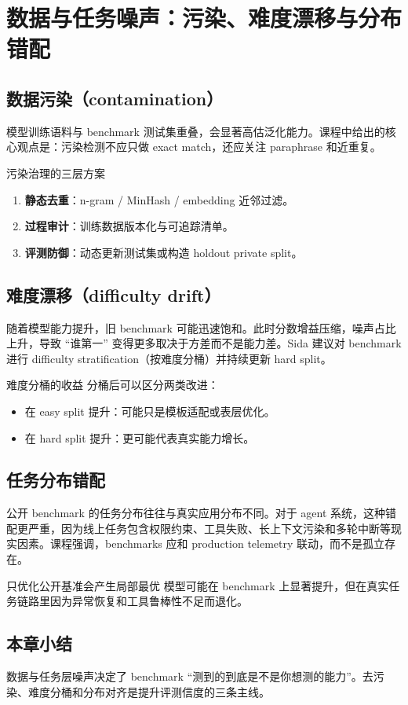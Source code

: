 \section{数据与任务噪声：污染、难度漂移与分布错配}

\subsection{数据污染（contamination）}
模型训练语料与 benchmark 测试集重叠，会显著高估泛化能力。课程中给出的核心观点是：污染检测不应只做 exact match，还应关注 paraphrase 和近重复。

\begin{importantbox}{污染治理的三层方案}
\begin{enumerate}
    \item \textbf{静态去重}：n-gram / MinHash / embedding 近邻过滤。
    \item \textbf{过程审计}：训练数据版本化与可追踪清单。
    \item \textbf{评测防御}：动态更新测试集或构造 holdout private split。
\end{enumerate}
\end{importantbox}

\subsection{难度漂移（difficulty drift）}
随着模型能力提升，旧 benchmark 可能迅速饱和。此时分数增益压缩，噪声占比上升，导致 ``谁第一'' 变得更多取决于方差而不是能力差。Sida 建议对 benchmark 进行 difficulty stratification（按难度分桶）并持续更新 hard split。

\begin{knowledgebox}{难度分桶的收益}
分桶后可以区分两类改进：
\begin{itemize}
    \item 在 easy split 提升：可能只是模板适配或表层优化。
    \item 在 hard split 提升：更可能代表真实能力增长。
\end{itemize}
\end{knowledgebox}

\subsection{任务分布错配}
公开 benchmark 的任务分布往往与真实应用分布不同。对于 agent 系统，这种错配更严重，因为线上任务包含权限约束、工具失败、长上下文污染和多轮中断等现实因素。课程强调，benchmarks 应和 production telemetry 联动，而不是孤立存在。

\begin{warningbox}{只优化公开基准会产生局部最优}
模型可能在 benchmark 上显著提升，但在真实任务链路里因为异常恢复和工具鲁棒性不足而退化。
\end{warningbox}

\subsection{本章小结}
数据与任务层噪声决定了 benchmark ``测到的到底是不是你想测的能力''。去污染、难度分桶和分布对齐是提升评测信度的三条主线。


